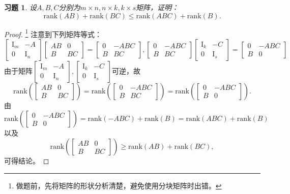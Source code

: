 \documentclass[UTF8]{ctexart}
\newtheorem{ex}[thm]{习题}
\begin{document}
\begin{ex}
	设$A, B, C$分别为$m \times n,  n \times k, k \times s$矩阵，证明：
	\[
	\mathrm{rank}(AB) + \mathrm{rank}(BC) \leq \mathrm{rank}(ABC) + \mathrm{rank}(B).   
	\]
\end{ex}
\begin{proof}\footnote{做题前，先将矩阵的形状分析清楚，避免使用分块矩阵时出错。}
	注意到下列矩阵等式：
	\[
	\begin{bmatrix}
		\mathrm{I}_m & -A \\
		0 & \mathrm{I}_n
	\end{bmatrix}\begin{bmatrix}
		AB & 0 \\
		B & BC
	\end{bmatrix} = \begin{bmatrix}
		0 & -ABC \\
		B & BC
	\end{bmatrix}, 
	\begin{bmatrix}
		0 & -ABC \\
		B & BC
	\end{bmatrix}\begin{bmatrix}
		\mathrm{I}_k & -C \\
		0 & \mathrm{I}_s
	\end{bmatrix}=\begin{bmatrix}
		0 & -ABC \\
		B & 0
	\end{bmatrix}
	\]
	由于矩阵$\begin{bmatrix}
		\mathrm{I}_m & -A \\
		0 & \mathrm{I}_n
	\end{bmatrix}, \begin{bmatrix}
		\mathrm{I}_k & -C \\
		0 & \mathrm{I}_s
	\end{bmatrix}$可逆，故
	\[
	\mathrm{rank}(\begin{bmatrix}
		AB & 0 \\
		B & BC
	\end{bmatrix}) = \mathrm{rank}(\begin{bmatrix}
		0 & -ABC \\
		B & BC
	\end{bmatrix}) = \mathrm{rank}(\begin{bmatrix}
		0 & -ABC \\
		B & 0
	\end{bmatrix}).
	\]
	由$\mathrm{rank}(\begin{bmatrix}
		0 & -ABC \\
		B & 0
	\end{bmatrix}) = \mathrm{rank}(-ABC) + \mathrm{rank}(B) = \mathrm{rank}(ABC)+\mathrm{rank}(B)$以及
	\[
	\mathrm{rank}(\begin{bmatrix}
		AB & 0 \\
		B & BC
	\end{bmatrix}) \geq \mathrm{rank}(AB) + \mathrm{rank}(BC),
	\]
	可得结论。
\end{proof}
\end{document}
